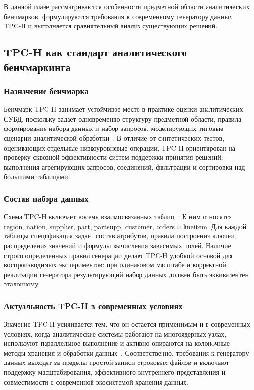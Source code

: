 В данной главе рассматриваются особенности предметной области аналитических
бенчмарков, формулируются требования к современному генератору данных TPC-H и
выполняется сравнительный анализ существующих решений.

\subsection{TPC-H как стандарт аналитического бенчмаркинга}

\subsubsection{Назначение бенчмарка}

Бенчмарк TPC-H занимает устойчивое место в практике оценки аналитических СУБД,
поскольку задает одновременно структуру предметной области, правила
формирования набора данных и набор запросов, моделирующих типовые сценарии
аналитической обработки~\cite{tpch-spec}. В отличие от синтетических тестов,
оценивающих отдельные низкоуровневые операции, TPC-H ориентирован на проверку
сквозной эффективности систем поддержки принятия решений: выполнения
агрегирующих запросов, соединений, фильтрации и сортировки над большими
таблицами.

\subsubsection{Состав набора данных}

Схема TPC-H включает восемь взаимосвязанных таблиц~\cite{tpch-spec}. К ним
относятся region, nation, supplier,
part, partsupp, customer, orders и
lineitem. Для каждой таблицы спецификация задает состав атрибутов,
правила построения ключей, распределения значений и формулы вычисления
зависимых полей. Наличие строго определенных правил генерации делает TPC-H
удобной основой для воспроизводимых экспериментов: при одинаковом масштабе и
корректной реализации генератора результирующий набор данных должен быть
эквивалентен эталонному.

\subsubsection{Актуальность TPC-H в современных условиях}

Значение TPC-H усиливается тем, что он остается применимым и в современных
условиях, когда аналитические системы работают на многоядерных узлах,
используют параллельное выполнение и активно опираются на колонoчные методы
хранения и обработки данных~\cite{dewitt-gray}. Соответственно, требования к
генератору данных выходят за пределы простой записи строковых файлов и включают
поддержку масштабирования, эффективного внутреннего представления и
совместимости с современной экосистемой хранения данных.

